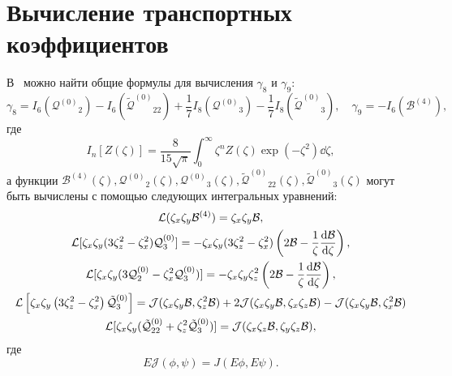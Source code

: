 \section{Вычисление транспортных коэффициентов}\label{sec:gamma8_9} %

\newcommand{\Q}{\ensuremath{\mathcal{Q}^{(0)}}}
\newcommand{\B}{\ensuremath{\mathcal{B}^{(4)}}}
\newcommand{\QQ}{\ensuremath{\tilde{\mathcal{Q}}^{(0)}}}

В~\cite{Sone2002} можно найти общие формулы для вычисления \(\gamma_8\) и \(\gamma_9\):
\begin{equation}\label{eq:gamma_8_9}
    \gamma_8 = I_6(\Q_2) - I_6(\QQ_{22}) + \frac17 I_8(\Q_3) - \frac17 I_8(\QQ_3), \quad
    \gamma_9 = -I_6(\B),
\end{equation}
где
\begin{equation}\label{eq:I_n}
    I_n[Z(\zeta)] = \frac{8}{15\sqrt\pi} \int_0^\infty \zeta^n Z(\zeta) \exp(-\zeta^2) \dd\zeta,
\end{equation}
а функции \(\B(\zeta), \Q_2(\zeta), \Q_3(\zeta), \QQ_{22}(\zeta), \QQ_3(\zeta)\) могут быть вычислены
с помощью следующих интегральных уравнений:
\begin{gather}
    \mathcal{L}(\zeta_x\zeta_y\B) = \zeta_x\zeta_y\mathcal{B}, \label{eq:B4_par}\\
    \mathcal{L}[\zeta_x\zeta_y(3\zeta_z^2-\zeta_x^2)\Q_3] =
        -\zeta_x\zeta_y(3\zeta_z^2-\zeta_x^2)\left(2\mathcal{B}-\frac1\zeta\der[\mathcal{B}]{\zeta}\right), \label{eq:Q3_par}\\
    \mathcal{L}[\zeta_x\zeta_y(3\Q_2-\zeta_x^2\Q_3)] =
        -\zeta_x\zeta_y\zeta_z^2\left(2\mathcal{B}-\frac1\zeta\der[\mathcal{B}]{\zeta}\right), \label{eq:Q2_par}\\
    \mathcal{L}\left[ \zeta_x\zeta_y\left( 3\zeta_z^2 - \zeta_x^2 \right)\QQ_3 \right]
        = \mathcal{J}(\zeta_x\zeta_y\mathcal{B}, \zeta_z^2\mathcal{B})
        + 2\mathcal{J}(\zeta_x\zeta_y\mathcal{B}, \zeta_x\zeta_z\mathcal{B})
        - \mathcal{J}(\zeta_x\zeta_y\mathcal{B}, \zeta_x^2\mathcal{B}) \label{eq:QQ3_par}\\
    \mathcal{L}[\zeta_x\zeta_y(\QQ_{22} + \zeta_z^2\QQ_3)] =
        \mathcal{J}(\zeta_x\zeta_z\mathcal{B}, \zeta_y\zeta_z\mathcal{B}), \label{eq:QQ22_par}
\end{gather}
где
\begin{equation}\label{eq:mathcalJ}
    E\mathcal{J}(\phi, \psi) = J(E\phi, E\psi).
\end{equation}


